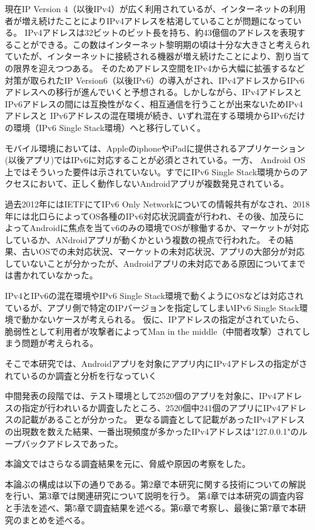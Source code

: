 \documentclass[a4j]{jarticle}
\begin{document}
現在IP Version 4（以後IPv4）が広く利用されているが、インターネットの利用者が増え続けたことによりIPv4アドレスを枯渇していることが問題になっている。
IPv4アドレスは32ビットのビット長を持ち、約43億個のアドレスを表現することができる。この数はインターネット黎明期の頃は十分な大きさと考えられていたが、インターネットに接続される機器が増え続けたことにより、割り当ての限界を迎えつつある。
そのためアドレス空間をIPv4から大幅に拡張するなど対策が取られたIP Version6（以後IPv6）の導入がされ、IPv4アドレスからIPv6アドレスへの移行が進んでいくと予想される。しかしながら、IPv4アドレスとIPv6アドレスの間には互換性がなく、相互通信を行うことが出来ないためIPv4アドレスと
IPv6アドレスの混在環境が続き、いずれ混在する環境からIPv6だけの環境（IPv6 Single Stack環境）へと移行していく。

モバイル環境においては、AppleのiphoneやiPadに提供されるアプリケーション(以後アプリ)ではIPv6に対応することが必須とされている。一方、
Android OS上ではそういった要件は示されていない。すでにIPv6 Single Stack環境からのアクセスにおいて、正しく動作しないAndroidアプリが複数発見されている。

過去2012年にはIETFにてIPv6 Only Networkについての情報共有がなされ、2018年には北口らによってOS各種のIPv6対応状況調査が行われ、その後、加茂らによってAndroidに焦点を当てv6のみの環境でOSが稼働するか、マーケットが対応しているか、ANdroidアプリが動くかという複数の視点で行われた。
その結果、古いOSでの未対応状況、マーケットの未対応状況、アプリの大部分が対応していないことが分かったが、Androidアプリの未対応である原因についてまでは書かれていなかった。

IPv4とIPv6の混在環境やIPv6 Single Stack環境で動くようにOSなどは対応されているが、アプリ側で特定のIPバージョンを指定してしまいIPv6 Single Stack環境で動かないケースが考えられる。
仮に、IPアドレスの指定がされていたら、脆弱性として利用者が攻撃者によってMan in the middle（中間者攻撃）されてしまう問題が考えられる。

そこで本研究では、Androidアプリを対象にアプリ内にIPv4アドレスの指定がされているのか調査と分析を行なっていく

中間発表の段階では、テスト環境として2520個のアプリを対象に、IPv4アドレスの指定が行われいるか調査したところ、2520個中241個のアプリにIPv4アドレスの記載があることが分かった。
更なる調査として記載があったIPv4アドレスの出現数を数えた結果、一番出現頻度が多かったIPv4アドレスは"127.0.0.1"のループバックアドレスであった。

本論文ではさらなる調査結果を元に、脅威や原因の考察をした。

本論ぶの構成は以下の通りである。第2章で本研究に関する技術についての解説を行い、第3章では関連研究について説明を行う。
第4章では本研究の調査内容と手法を述べ、第5章で調査結果を述べる。第6章で考察し、最後に第7章で本研究のまとめを述べる。
\end{document}

